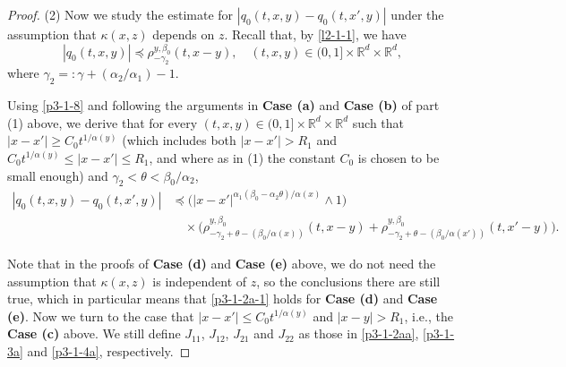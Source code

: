 \documentclass[a4paper,11pt]{amsart}
\renewcommand{\le}{\leqslant}
\renewcommand{\ge}{\geqslant}
\newcommand{\R}{\mathds R}
\newcommand{\B}{\beta}
\newcommand{\p}{\preceq}
\newcommand{\K}{\kappa}
\newcommand{\A}{\alpha}
\newcommand{\G}{\gamma}
\theoremstyle{definition}
\begin{document}
\begin{proof}
(2) Now we study the estimate for $|q_0(t,x,y)-q_0(t,x',y)|$ under the assumption that
$\K(x,z)$ depends on $z$.
Recall that, by  \eqref{l2-1-1}, we have
\begin{equation}\label{p3-1-8}
|q_0(t,x,y)|\p \rho^{y,\B_0}_{-\G_2 }(t,x-y),\quad (t,x,y)\in (0,1]\times \R^d \times \R^d,
\end{equation}
where $\G_2 =:\gamma+({\A_2}/{\A_1})-1$.

Using \eqref{p3-1-8} and following the arguments in {\bf Case (a)} and {\bf Case (b)} of  part (1) above, we derive that for every $(t,x,y)\in (0,1]\times \R^d \times \R^d$ such that
$|x-x'|\ge C_0t^{{1/\A(y)}}$ (which includes both $|x-x'|>R_1$
and $C_0t^{{1/\A(y)}}\le |x-x'|\le R_1$, and where as in (1) the constant $C_0$ is chosen to be small enough) and $\G_2 <\theta<{\B_0}/{\A_2}$,
\begin{align*}
|q_0(t,x,y)-q_0(t,x',y)|& \p
\big(|x-x'|^{\A_1(\B_0-\A_2\theta)/{\A(x)}}\wedge 1\big)\\
&\quad\times\big(\rho^{y,\B_0}_{-\G_2 +\theta-({\B_0}/{\A(x)})}(t,x-y)
+\rho^{y,\B_0}_{-\G_2 +\theta-({\B_0}/{\A(x')})}(t,x'-y)\big).
\end{align*}

Note that
in the proofs of {\bf Case (d)} and {\bf Case (e)} above, we do not need the assumption that
$\K(x,z)$ is independent of $z$, so the conclusions there are still true, which in particular means that
\eqref{p3-1-2a-1} holds for {\bf Case (d)} and {\bf Case (e)}.
Now we turn to the case that $|x-x'|\le C_0t^{{1/\A(y)}}$ and $|x-y|>R_1$, i.e., the {\bf Case (c)} above.
We still define
$J_{11}$, $J_{12}$, $J_{21}$ and $J_{22}$ as those in \eqref{p3-1-2aa}, \eqref{p3-1-3a} and \eqref{p3-1-4a}, respectively.



\end{proof}
\end{document}
